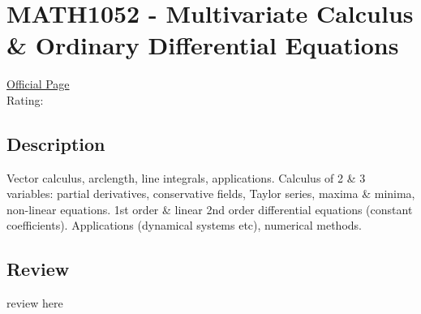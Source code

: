\hypertarget{MATH1052}{\section{MATH1052 - Multivariate Calculus \& Ordinary Differential Equations}}

\large
\textcolor{turbo_purple}{\href{https://my.uq.edu.au/programs-courses/course.html?course_code=MATH1052}{Official Page}} \\
Rating: \cstar\cstar\cstar\cstar\ostar

\normalsize
\subsection*{Description}
Vector calculus, arclength, line integrals, applications.
Calculus of 2 \& 3 variables: partial derivatives, conservative fields, Taylor series, maxima \& minima, non-linear equations.
1st order \& linear 2nd order differential equations (constant coefficients).
Applications (dynamical systems etc), numerical methods.

\subsection*{Review}
review here

